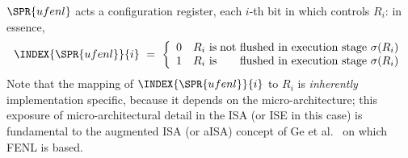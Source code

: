 $\SPR{ufenl}$
acts a configuration register, each $i$-th bit in which controls $R_i$: 
in essence, 
\[
\INDEX{\SPR{ufenl}}{i} ~=~ \left\{\begin{array}{ll@{\;}r}
                                  0 & \mbox{$R_i$ is} & \mbox{not flushed in execution stage $\sigma( R_i )$} \\
                                  1 & \mbox{$R_i$ is} & \mbox{    flushed in execution stage $\sigma( R_i )$} \\
                                  \end{array}
                             \right.
\]
Note that the mapping of 
$\INDEX{\SPR{ufenl}}{i}$
to 
$R_i$
is {\em inherently} implementation specific, because it depends on the
micro-architecture; this exposure of micro-architectural detail in the
ISA (or ISE in this case) is fundamental to the augmented ISA (or aISA) 
concept of
Ge et al.~\cite{SCARV:GeYarHei:18}
on which FENL is based.

